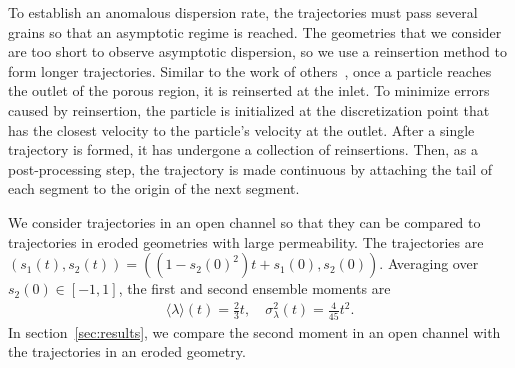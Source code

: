 \documentclass{jfm}
\begin{document}
To establish an anomalous dispersion rate, the trajectories must pass
several grains so that an asymptotic regime is reached. The geometries
that we consider are too short to observe asymptotic dispersion, so we
use a reinsertion method to form longer trajectories. Similar to the
work of others~\citep{dea-qua-bir-jua2018, puy-gou-den2019}, once a
particle reaches the outlet of the porous region, it is reinserted at
the inlet.  To minimize errors caused by reinsertion, the particle is
initialized at the discretization point that has the closest velocity to
the particle's velocity at the outlet.  After a single trajectory is
formed, it has undergone a collection of reinsertions.  Then, as a
post-processing step, the trajectory is made continuous by attaching the
tail of each segment to the origin of the next segment.

We consider trajectories in an open channel so that they can be compared
to trajectories in eroded geometries with large permeability.  The
trajectories are $(s_1(t),s_2(t)) = ((1-s_2(0)^2)t + s_1(0), s_2(0))$.
Averaging over $s_2(0) \in [-1,1]$, the first and second ensemble
moments are
\begin{align}
  \langle \lambda \rangle (t) = \frac{2}{3}t, \quad 
    \sigma_\lambda^2(t) = \frac{4}{45}t^2.
\end{align}
In section~\ref{sec:results}, we compare the second moment in an open
channel with the trajectories in an eroded geometry.

\end{document}

